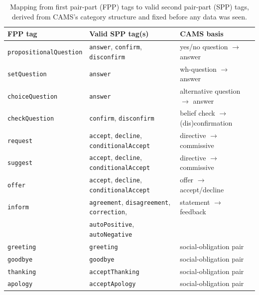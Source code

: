 \documentclass[11pt]{article}
\begin{document}
\begin{table}[t]
\centering
\caption{Mapping from first pair-part (FPP) tags to valid second pair-part
(SPP) tags, derived from CAMS's category structure \citep{duran2022cams} and
fixed before any data was seen.}
\label{tab:fpp-spp}
\footnotesize
\begin{tabular}{@{}lll@{}}
\toprule
FPP tag & Valid SPP tag(s) & CAMS basis \\
\midrule
\texttt{propositionalQuestion} & \texttt{answer}, \texttt{confirm}, \texttt{disconfirm} & yes/no question $\to$ answer \\
\texttt{setQuestion} & \texttt{answer} & wh-question $\to$ answer \\
\texttt{choiceQuestion} & \texttt{answer} & alternative question $\to$ answer \\
\texttt{checkQuestion} & \texttt{confirm}, \texttt{disconfirm} & belief check $\to$ (dis)confirmation \\
\texttt{request} & \texttt{accept}, \texttt{decline}, \texttt{conditionalAccept} & directive $\to$ commissive \\
\texttt{suggest} & \texttt{accept}, \texttt{decline}, \texttt{conditionalAccept} & directive $\to$ commissive \\
\texttt{offer} & \texttt{accept}, \texttt{decline}, \texttt{conditionalAccept} & offer $\to$ accept/decline \\
\texttt{inform} & \texttt{agreement}, \texttt{disagreement}, \texttt{correction}, & statement $\to$ feedback \\
 & \texttt{autoPositive}, \texttt{autoNegative} & \\
\texttt{greeting} & \texttt{greeting} & social-obligation pair \\
\texttt{goodbye} & \texttt{goodbye} & social-obligation pair \\
\texttt{thanking} & \texttt{acceptThanking} & social-obligation pair \\
\texttt{apology} & \texttt{acceptApology} & social-obligation pair \\
\bottomrule
\end{tabular}
\end{table}
\end{document}
